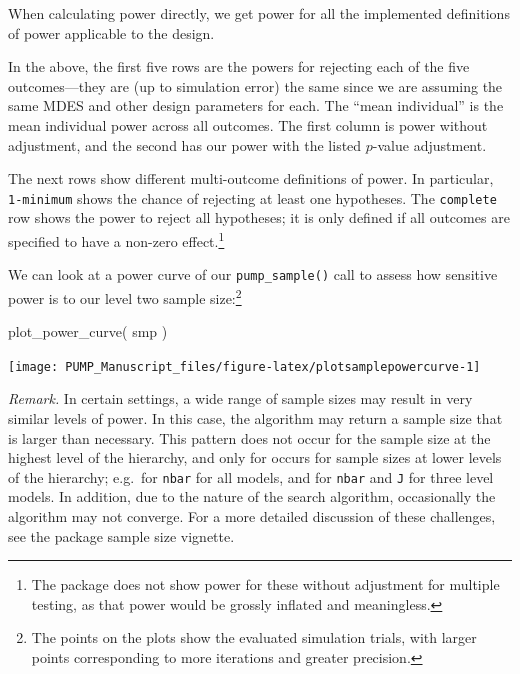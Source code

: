 \documentclass[
]{article}
\newenvironment{Shaded}{\begin{snugshade}}{\end{snugshade}}
\newcommand{\FunctionTok}[1]{\textcolor[rgb]{0.00,0.00,0.00}{#1}}
\newcommand{\NormalTok}[1]{#1}
\begin{document}
When calculating power directly, we get power for all the implemented
definitions of power applicable to the design.

In the above, the first five rows are the powers for rejecting each of
the five outcomes---they are (up to simulation error) the same since we
are assuming the same MDES and other design parameters for each. The
``mean individual'' is the mean individual power across all outcomes.
The first column is power without adjustment, and the second has our
power with the listed \(p\)-value adjustment.

The next rows show different multi-outcome definitions of power. In
particular, \texttt{1-minimum} shows the chance of rejecting at least
one hypotheses. The \texttt{complete} row shows the power to reject all
hypotheses; it is only defined if all outcomes are specified to have a
non-zero
effect.\footnote{The package does not show power for these without adjustment for multiple testing, as that power would be grossly inflated and meaningless.}

We can look at a power curve of our \texttt{pump\_sample()} call to
assess how sensitive power is to our level two sample
size:\footnote{The points on the plots show the evaluated simulation trials, with larger points corresponding to more iterations and greater precision.}

\begin{Shaded}
\begin{Highlighting}[]
\FunctionTok{plot\_power\_curve}\NormalTok{( smp )}
\end{Highlighting}
\end{Shaded}

\begin{center}\texttt{[image: PUMP\_Manuscript\_files/figure-latex/plotsamplepowercurve-1]} \end{center}

\emph{Remark.} In certain settings, a wide range of sample sizes may
result in very similar levels of power. In this case, the algorithm may
return a sample size that is larger than necessary. This pattern does
not occur for the sample size at the highest level of the hierarchy, and
only for occurs for sample sizes at lower levels of the hierarchy;
e.g.~for \texttt{nbar} for all models, and for \texttt{nbar} and
\texttt{J} for three level models. In addition, due to the nature of the
search algorithm, occasionally the algorithm may not converge. For a
more detailed discussion of these challenges, see the package sample
size vignette.
\end{document}
